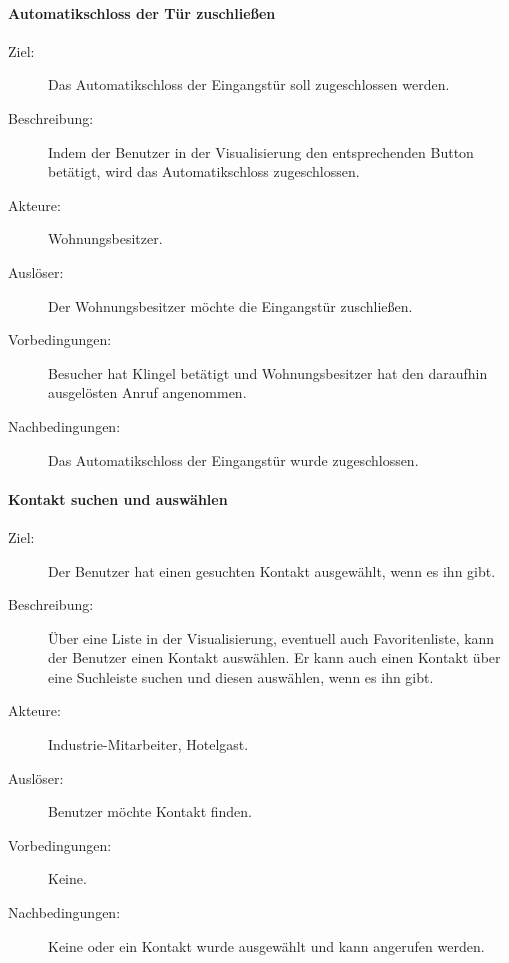 \paragraph{\large{Automatikschloss der Tür zuschließen}}
    \begin{description}
        \item[Ziel:] Das Automatikschloss der Eingangstür soll zugeschlossen werden.
        \item[Beschreibung:] Indem der Benutzer in der Visualisierung den entsprechenden Button betätigt, wird das Automatikschloss zugeschlossen.
        \item[Akteure:] Wohnungsbesitzer.
        \item[Auslöser:] Der Wohnungsbesitzer möchte die Eingangstür zuschließen.
        \item[Vorbedingungen:] Besucher hat Klingel betätigt und Wohnungsbesitzer hat den daraufhin ausgelösten Anruf angenommen.
        \item[Nachbedingungen:] Das Automatikschloss der Eingangstür wurde zugeschlossen.
    \end{description}

\paragraph{\large{Kontakt suchen und auswählen}}
    \begin{description}
        \item[Ziel:] Der Benutzer hat einen gesuchten Kontakt ausgewählt, wenn es ihn gibt.
        \item[Beschreibung:] Über eine Liste in der Visualisierung, eventuell auch Favoritenliste, kann der Benutzer einen Kontakt auswählen.
            Er kann auch einen Kontakt über eine Suchleiste suchen und diesen auswählen, wenn es ihn gibt.
        \item[Akteure:] Industrie-Mitarbeiter, Hotelgast.
        \item[Auslöser:] Benutzer möchte Kontakt finden.
        \item[Vorbedingungen:] Keine.
        \item[Nachbedingungen:] Keine oder ein Kontakt wurde ausgewählt und kann angerufen werden.
    \end{description}

